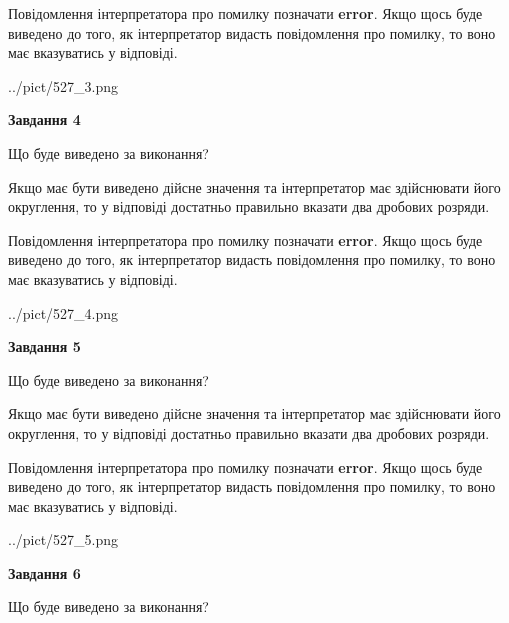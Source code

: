 \documentclass[12pt, ukrainian]{article}
\begin{document}
{\begin {Large}
Повідомлення інтерпретатора про помилку позначати \textbf{error}.
Якщо щось буде виведено до того, як інтерпретатор видасть повідомлення про помилку, 
то воно має вказуватись у відповіді. \par

\begin{center}
	{../pict/527_3.png}
\end{center}
\newpage

{\begin {center}\textbf{Завдання 4}\end {center}}\par
Що буде виведено за виконання? \par

Якщо має бути виведено дійсне значення та інтерпретатор має здійснювати його округлення, 
то у відповіді достатньо правильно вказати два дробових розряди.

Повідомлення інтерпретатора про помилку позначати \textbf{error}.
Якщо щось буде виведено до того, як інтерпретатор видасть повідомлення про помилку, 
то воно має вказуватись у відповіді. \par

\begin{center}
	{../pict/527_4.png}
\end{center}
\newpage

{\begin {center}\textbf{Завдання 5}\end {center}}\par
Що буде виведено за виконання? \par

Якщо має бути виведено дійсне значення та інтерпретатор має здійснювати його округлення, 
то у відповіді достатньо правильно вказати два дробових розряди.

Повідомлення інтерпретатора про помилку позначати \textbf{error}.
Якщо щось буде виведено до того, як інтерпретатор видасть повідомлення про помилку, 
то воно має вказуватись у відповіді. \par

\begin{center}
	{../pict/527_5.png}
\end{center}
\newpage

{\begin {center}\textbf{Завдання 6}\end {center}}\par
Що буде виведено за виконання? \par


\end{Large}}
\end{document}
